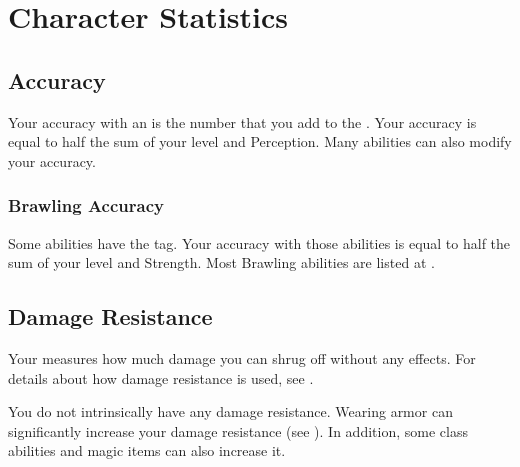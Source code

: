 \section{Character Statistics}\label{Character Statistics}

    \subsection{Accuracy}\label{Accuracy}
        Your accuracy with an  is the number that you add to the .
        Your accuracy is equal to half the sum of your level and Perception.
        Many abilities can also modify your accuracy.

        \subsubsection{Brawling Accuracy}\label{Brawling Accuracy}
            Some abilities have the  tag.
            Your accuracy with those abilities is equal to half the sum of your level and Strength.
            Most Brawling abilities are listed at .

    \subsection{Damage Resistance}\label{Damage Resistance}
        Your  measures how much damage you can shrug off without any effects.
        For details about how damage resistance is used, see .

        You do not intrinsically have any damage resistance.
        Wearing armor can significantly increase your damage resistance (see ).
        In addition, some class abilities and magic items can also increase it.

